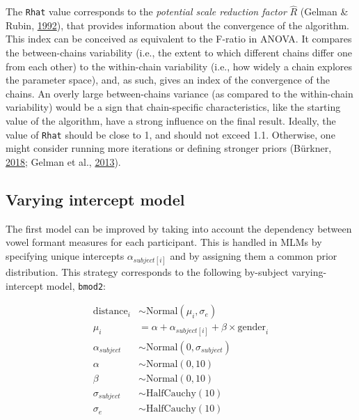 \documentclass[a4paper,12pt,twoside,openright,oldfontcommands]{memoir}
\begin{document}
The \texttt{Rhat} value corresponds to the \emph{potential scale reduction factor} \(\hat{R}\) (Gelman \& Rubin, \protect\hyperlink{ref-gelman_inference_1992}{1992}), that provides information about the convergence of the algorithm. This index can be conceived as equivalent to the F-ratio in ANOVA. It compares the between-chains variability (i.e., the extent to which different chains differ one from each other) to the within-chain variability (i.e., how widely a chain explores the parameter space), and, as such, gives an index of the convergence of the chains. An overly large between-chains variance (as compared to the within-chain variability) would be a sign that chain-specific characteristics, like the starting value of the algorithm, have a strong influence on the final result. Ideally, the value of \texttt{Rhat} should be close to 1, and should not exceed 1.1. Otherwise, one might consider running more iterations or defining stronger priors (Bürkner, \protect\hyperlink{ref-R-brms}{2018}; Gelman et al., \protect\hyperlink{ref-gelman_bayesian_2013}{2013}).

\hypertarget{shrink}{%
\subsection{Varying intercept model}\label{shrink}}

The first model can be improved by taking into account the dependency between vowel formant measures for each participant. This is handled in MLMs by specifying unique intercepts \(\alpha_{subject[i]}\) and by assigning them a common prior distribution. This strategy corresponds to the following by-subject varying-intercept model, \texttt{bmod2}:

\[
\begin{aligned}
\text{distance}_{i} &\sim \mathrm{Normal}(\mu_{i}, \sigma_{e}) \\
\mu_{i} &= \alpha + \alpha_{subject[i]} + \beta \times \text{gender}_{i} \\
\alpha_{subject} &\sim \mathrm{Normal}(0, \sigma_{subject}) \\
\alpha &\sim \mathrm{Normal}(0, 10) \\
\beta &\sim \mathrm{Normal}(0, 10) \\
\sigma_{subject} &\sim \mathrm{HalfCauchy}(10) \\
\sigma_{e} &\sim \mathrm{HalfCauchy}(10) \\
\end{aligned}
\]

\vspace{5mm}
\end{document}
